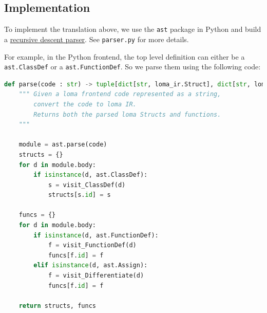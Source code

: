 \subsection{Implementation}

To implement the translation above, we use the \lstinline{ast} package in Python and build a \href{https://en.wikipedia.org/wiki/Recursive_descent_parser}{recursive descent parser}. See \lstinline{parser.py} for more details.

For example, in the Python frontend, the top level definition can either be a \lstinline{ast.ClassDef} or a \lstinline{ast.FunctionDef}. So we parse them using the following code:
\begin{lstlisting}[language=Python]
def parse(code : str) -> tuple[dict[str, loma_ir.Struct], dict[str, loma_ir.func]]:
    """ Given a loma frontend code represented as a string,
        convert the code to loma IR.
        Returns both the parsed loma Structs and functions.
    """

    module = ast.parse(code)
    structs = {}
    for d in module.body:
        if isinstance(d, ast.ClassDef):
            s = visit_ClassDef(d)
            structs[s.id] = s

    funcs = {}
    for d in module.body:
        if isinstance(d, ast.FunctionDef):
            f = visit_FunctionDef(d)
            funcs[f.id] = f
        elif isinstance(d, ast.Assign):
            f = visit_Differentiate(d)
            funcs[f.id] = f

    return structs, funcs
\end{lstlisting}

